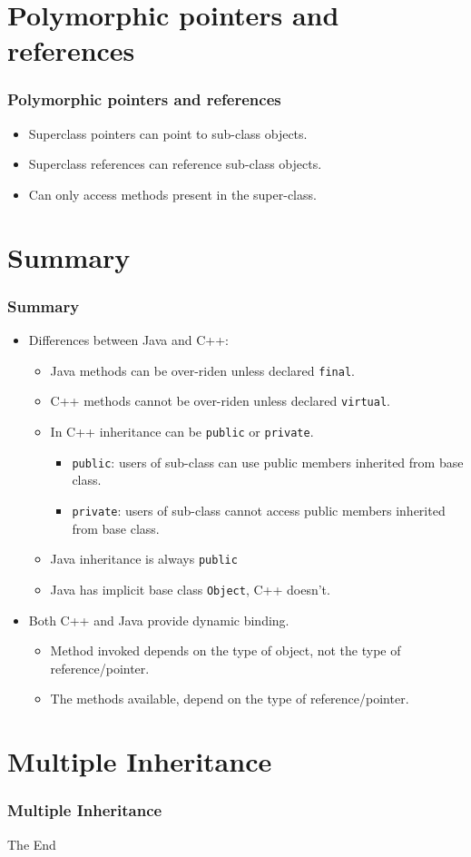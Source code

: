 \documentclass{beamer}
\begin{document}
\section{Polymorphic pointers and references}
\begin{frame}
\frametitle{Polymorphic pointers and references}
\begin{itemize}
\item Superclass pointers can point to sub-class objects.
\item Superclass references can reference sub-class objects.
\item Can only access methods present in the super-class.
\poly
\end{itemize}
\end{frame}
\section{Summary}
\begin{frame}
\frametitle{Summary}
\begin{itemize}
\item Differences between Java and C++:
\begin{itemize}
\item Java methods can be over-riden unless declared \texttt{final}.
\item C++ methods cannot be over-riden unless declared \texttt{virtual}.
\item In C++ inheritance can be \texttt{public} or \texttt{private}.
\begin{itemize}
\item \texttt{public}: users of sub-class can use public members inherited from base class.
\item \texttt{private}: users of sub-class cannot access public members inherited from base class.
\end{itemize}
\item Java inheritance is always \texttt{public}
\item Java has implicit base class \texttt{Object}, C++ doesn't.
\end{itemize}
\item Both C++ and Java provide dynamic binding.
\begin{itemize}
\item Method invoked depends on the type of object, not the type of reference/pointer.
\item The methods available, depend on the type of reference/pointer.
\end{itemize}
\end{itemize}
\end{frame}

\section{Multiple Inheritance}
\begin{frame}
\frametitle{Multiple Inheritance}
\end{frame}

\begin{frame} 
\Huge{\centerline{The End}}
\end{frame}
\end{document}
